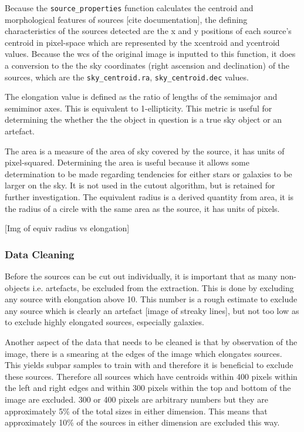 \documentclass[a4paper,fleqn,usenatbib]{mnras}
\begin{document}
Because the \lstinline{source_properties} function calculates the centroid and morphological features of sources [cite documentation], the defining characteristics of the sources detected are the x and y positions of each source's centroid in pixel-space which are represented by the xcentroid and ycentroid values. Because the wcs of the original image is inputted to this function, it does a conversion to the the sky coordinates (right ascension and declination) of the sources, which are the \lstinline{sky_centroid.ra}, \lstinline{sky_centroid.dec} values. 

The elongation value is defined as the ratio of lengths of the semimajor and semiminor axes. This is equivalent to 1-ellipticity. This metric is useful for determining the whether the the object in question is a true sky object or an artefact. 

The area is a measure of the area of sky covered by the source, it has units of pixel-squared. Determining the area is useful because it allows some determination to be made regarding tendencies for either stars or galaxies to be larger on the sky. It is not used in the cutout algorithm, but is retained for further investigation. The equivalent radius is a derived quantity from area, it is the radius of a circle with the same area as the source, it has units of pixels. 

[Img of equiv radius vs elongation]

\subsubsection{Data Cleaning}
Before the sources can be cut out individually, it is important that as many non-objects i.e. artefacts, be excluded from the extraction. This is done by excluding any source with elongation above 10. This number is a rough estimate to exclude any source which is clearly an artefact [image of streaky lines], but not too low as to exclude highly elongated sources, especially galaxies. 

Another aspect of the data that needs to be cleaned is that by observation of the image, there is a smearing at the edges of the image which elongates sources. This yields subpar samples to train with and therefore it is beneficial to exclude these sources. Therefore all sources which have centroids within 400 pixels within the left and right edges and within 300 pixels within the top and bottom of the image are excluded. 300 or 400 pixels are arbitrary numbers but they are approximately 5\% of the total sizes in either dimension. This means that approximately 10\% of the sources in either dimension are excluded this way. 
\end{document}
